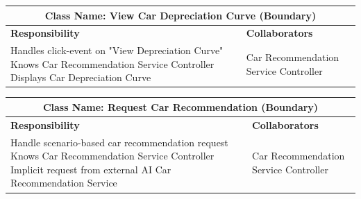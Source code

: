 \documentclass[]{article}
\begin{document}
\begin{itemize}
\begin{table}[H]
\begin{tabular}{|p{6cm}|p{6cm}|}
            \hline
            \end{tabular}
        \end{table}
        \begin{table}[H]
            \centering
            \renewcommand{\arraystretch}{1.3} %
            \begin{tabular}{|p{6cm}|p{6cm}|} 
            \hline
            \multicolumn{2}{|c|}{\textbf{Class Name: View Car Depreciation Curve (Boundary)}} \\ 
            \hline
            \textbf{Responsibility} & \textbf{Collaborators} \\ 
            \hline
            Handles click-event on "View Depreciation Curve" \newline
            Knows Car Recommendation Service Controller \newline
            Displays Car Depreciation Curve & Car Recommendation Service Controller \\ 
            \hline
            \end{tabular}
        \label{tab:crc_card}
        \end{table}   
        \begin{table}[H]
            \centering
            \renewcommand{\arraystretch}{1.3} %
            \begin{tabular}{|p{6cm}|p{6cm}|} 
            \hline
            \multicolumn{2}{|c|}{\textbf{Class Name: Request Car Recommendation (Boundary)}} \\ 
            \hline
            \textbf{Responsibility} & \textbf{Collaborators} \\ 
            \hline
            Handle scenario-based car recommendation request \newline
            Knows Car Recommendation Service Controller \newline
            Implicit request from external AI Car Recommendation Service & Car Recommendation Service Controller \\ 
            \hline
            \end{tabular}
            \label{tab:crc_card}
        \end{table}
            

\end{itemize}
\end{document}
